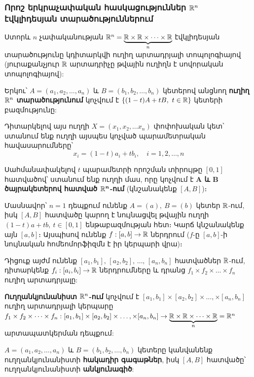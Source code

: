\documentclass[./main.tex]{subfiles}
\begin{document}
\subsubsection*{Որոշ երկրաչափական հասկացություններ $\mathbb{R}^n$ էվկլիդեսյան տարածություններում}

Ստորև $n$ չափականության $\mathbb{R}^n=\underbrace{\mathbb{R}\times \mathbb{R}\times \dots\times \mathbb{R}}_\text{$n$}$ էվկլիդեսյան տարածությունը կդիտարկվի ուղիղ արտադրյալի տոպոլոգիայով (յուրաքանչյուր $\mathbb{R}$ արտադրիչը թվա\-յին ուղիղն է սովորական տոպոլոգիայով):
\begin{definition}
Երկու՝ $A=(a_1,a_2,\dots, a_n)$ և $B=(b_1,b_2,\dots, b_n)$ կետերով անցնող \textbf{ուղիղ $\mathbb{R}^n$ տարածությունում} կոչվում է $\{(1-t)A+tB,\ t\in \mathbb{R}\}$ կետերի բազմությու\-նը:
\par Դիտարկելով այս ուղղի $X=(x_1,x_2,\dots x_n)$ փոփոխական կետ՝ ստանում ենք ուղղի այսպես կոչված պարամետրական հավասարումները՝ \densequation
\[ x_i=(1-t)a_i+tb_i,\quad i=1,2,\dots,n \]
\par Սահմանափակելով $t$ պարամետրի որոշման տիրույթը $[0,1]$ հատվածով՝ ստանում ենք ուղղի մաս, որը կոչվում է \textbf{$\boldsymbol{A}$ և $\boldsymbol{B}$ ծայրակետերով հատված $\boldsymbol{\mathbb{R}^n}$-ում} (կնշանա\-կենք $[A,B]$)։
\par Մասնավոր՝ $n=1$ դեպքում ունենք $A=(a),\ B=(b)$ կետեր $\mathbb{R}$-ում, իսկ $[A,B]$ հատվածը կարող է նույնացվել թվային ուղղի $(1-t)a+tb,\ t\in [0,1]$ ենթաբազմու\-թյան հետ։ Կարճ կնշանակենք այն $[a,b]$։ Այսպիսով ունենք $f:[a,b]\rightarrow \mathbb{R}$ ներդրում ($f$-ը $[a,b]$-ի նույնական հոմեոմորֆիզմն է իր կերպարի վրա)։
\end{definition} 
\par Դիցուք այժմ ունենք $[a_1,b_1],\, [a_2,b_2],\, \dots,\, [a_n,b_n]$ հատվածներ $\mathbb{R}$-ում, դիտարկենք $f_i:[a_i,b_i]\rightarrow \mathbb{R}$ ներդրումները և դրանց $f_1\times f_2\times \dots\times f_n$ ուղիղ արտադրյալը:
\begin{definition}
\textbf{Ուղղանկյունանիստ $\mathbb{R}^n$-ում} կոչվում է $[a_1,b_1 ]\times [a_2,b_2 ]\times \dots,\times [a_n,b_n ]$ ուղիղ արտադրյալի կերպարը $f_1\times f_2\times \dots\times f_n:[a_1,b_1]\times [a_2,b_2]\times \dots,\times [a_n,b_n]\rightarrow \underbrace{\mathbb{R}\times \mathbb{R}\times \dots\times \mathbb{R}}_\text{$n$}=\mathbb{R}^n$ արտապատկերման դեպքում:
\par $A=(a_1,a_2,\dots, a_n)$ և $B=(b_1,b_2,\dots, b_n)$ կետերը կանվանենք ուղղանկյունա\-նիս\-տի \textbf{հակադիր գագաթներ}, իսկ $[A,B]$  հատվածը՝ ուղղանկյունանիստի \textbf{անկյունա\-գիծ}:
\end{definition} 
\end{document}
